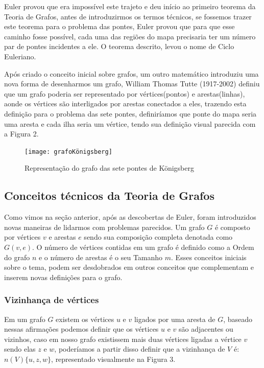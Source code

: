 \documentclass[12pt]{article}
\begin{document}
	Euler provou que era impossível este trajeto e deu início ao primeiro teorema da Teoria de Grafos, antes de introduzirmos os termos técnicos, se fossemos trazer este teorema para o problema das pontes, Euler provou que para que esse caminho fosse possível, cada uma das regiões do mapa precisaria ter um número par de pontes incidentes a ele. O teorema descrito, levou o nome de Ciclo Euleriano.
	
	Após criado o conceito inicial sobre grafos, um outro matemático introduziu uma nova forma de desenharmos um grafo, William Thomas Tutte (1917-2002) definiu que um grafo poderia ser representado por vértices(pontos) e arestas(linhas), aonde os vértices são interligados por arestas conectados a eles, trazendo esta definição para o problema das sete pontes, definiríamos que ponte do mapa seria uma aresta e cada ilha seria um vértice, tendo sua definição visual parecida com a Figura 2.
	
	
	\begin{figure}[!htb]
		\centering
		\texttt{[image: grafoKönigsberg]}
		\caption{Representação do grafo das sete pontes de Königsberg}    
	\end{figure}
	
	
	\subsection{Conceitos técnicos da Teoria de Grafos}
	Como vimos na seção anterior, após as descobertas de Euler, foram introduzidos novas maneiras de lidarmos com problemas parecidos.
	Um grafo $G$ é composto por vértices $v$ e arestas $e$ sendo sua composição completa denotada como $G (v, e)$. O número de vértices contidas em um grafo é definido como a Ordem do grafo $n$ e o número de arestas é o seu Tamanho $m$. Esses conceitos iniciais sobre o tema, podem ser desdobrados em outros conceitos que complementam e inserem novas definições para o grafo.
	
	\subsubsection{Vizinhança de vértices}
	
	Em um grafo $G$ existem os vértices $u$ e $v$ ligados por uma aresta de $G$, baseado nessas afirmações podemos definir que os vértices $u$ e $v$ são adjacentes ou vizinhos, caso em nosso grafo existissem mais duas vértices ligadas a vértice $v$ sendo elas $z$ e $w$, poderíamos a partir disso definir que a vizinhança de $V$ é: $n (V) \{u, z, w\}$, representado visualmente na Figura 3. 
	
\end{document}
